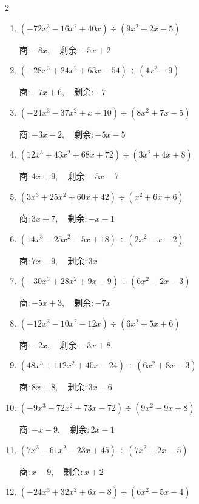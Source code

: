 \begin{multicols}{2}
\begin{enumerate}
  \item $(-72x^{3}-16x^{2}+40x) \div (9x^{2}+2x-5)$

        $商 : -8x, \quad 剰余 : -5x+2$

  \item $(-28x^{3}+24x^{2}+63x-54) \div (4x^{2}-9)$

        $商 : -7x+6, \quad 剰余 : -7$

  \item $(-24x^{3}-37x^{2}+x+10) \div (8x^{2}+7x-5)$

        $商 : -3x-2, \quad 剰余 : -5x-5$

  \item $(12x^{3}+43x^{2}+68x+72) \div (3x^{2}+4x+8)$

        $商 : 4x+9, \quad 剰余 : -5x-7$

  \item $(3x^{3}+25x^{2}+60x+42) \div (x^{2}+6x+6)$

        $商 : 3x+7, \quad 剰余 : -x-1$

\columnbreak %

  \item $(14x^{3}-25x^{2}-5x+18) \div (2x^{2}-x-2)$

        $商 : 7x-9, \quad 剰余 : 3x$

  \item $(-30x^{3}+28x^{2}+9x-9) \div (6x^{2}-2x-3)$

        $商 : -5x+3, \quad 剰余 : -7x$

  \item $(-12x^{3}-10x^{2}-12x) \div (6x^{2}+5x+6)$

        $商 : -2x, \quad 剰余 : -3x+8$

  \item $(48x^{3}+112x^{2}+40x-24) \div (6x^{2}+8x-3)$

        $商 : 8x+8, \quad 剰余 : 3x-6$

  \item $(-9x^{3}-72x^{2}+73x-72) \div (9x^{2}-9x+8)$

        $商 : -x-9, \quad 剰余 : 2x-1$

\columnbreak %

\resetques

  \item $(7x^{3}-61x^{2}-23x+45) \div (7x^{2}+2x-5)$

        $商 : x-9, \quad 剰余 : x+2$

  \item $(-24x^{3}+32x^{2}+6x-8) \div (6x^{2}-5x-4)$


\end{enumerate}
\end{multicols}
